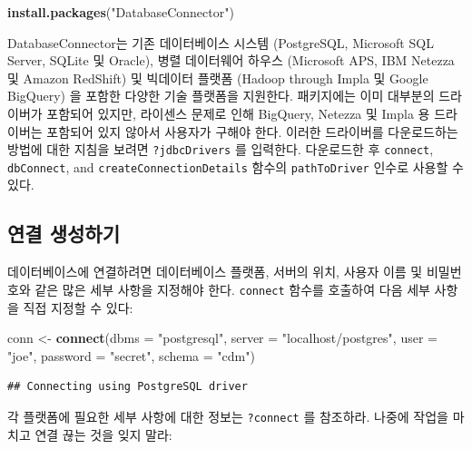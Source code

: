 \documentclass[10.5pt]{book}
\newenvironment{Shaded}{\begin{snugshade}}{\end{snugshade}}
\newcommand{\KeywordTok}[1]{\textcolor[rgb]{0.13,0.29,0.53}{\textbf{#1}}}
\newcommand{\DataTypeTok}[1]{\textcolor[rgb]{0.13,0.29,0.53}{#1}}
\newcommand{\StringTok}[1]{\textcolor[rgb]{0.31,0.60,0.02}{#1}}
\newcommand{\NormalTok}[1]{#1}
\theoremstyle{definition}
\theoremstyle{definition}
\theoremstyle{definition}
\theoremstyle{remark}
\begin{document}
\begin{Shaded}
\begin{Highlighting}[]
\KeywordTok{install.packages}\NormalTok{(}\StringTok{"DatabaseConnector"}\NormalTok{)}
\end{Highlighting}
\end{Shaded}

DatabaseConnector는 기존 데이터베이스 시스템 (PostgreSQL, Microsoft SQL
Server, SQLite 및 Oracle), 병렬 데이터웨어 하우스 (Microsoft APS, IBM
Netezza 및 Amazon RedShift) 및 빅데이터 플랫폼 (Hadoop through Impla 및
Google BigQuery) 을 포함한 다양한 기술 플랫폼을 지원한다. 패키지에는
이미 대부분의 드라이버가 포함되어 있지만, 라이센스 문제로 인해 BigQuery,
Netezza 및 Impla 용 드라이버는 포함되어 있지 않아서 사용자가 구해야
한다. 이러한 드라이버를 다운로드하는 방법에 대한 지침을 보려면
\texttt{?jdbcDrivers} 를 입력한다. 다운로드한 후 \texttt{connect},
\texttt{dbConnect}, and \texttt{createConnectionDetails} 함수의
\texttt{pathToDriver} 인수로 사용할 수 있다.

\subsection{연결 생성하기}\label{-}

데이터베이스에 연결하려면 데이터베이스 플랫폼, 서버의 위치, 사용자 이름
및 비밀번호와 같은 많은 세부 사항을 지정해야 한다. \texttt{connect}
함수를 호출하여 다음 세부 사항을 직접 지정할 수 있다:

\begin{Shaded}
\begin{Highlighting}[]
\NormalTok{conn <-}\StringTok{ }\KeywordTok{connect}\NormalTok{(}\DataTypeTok{dbms =} \StringTok{"postgresql"}\NormalTok{,}
                \DataTypeTok{server =} \StringTok{"localhost/postgres"}\NormalTok{,}
                \DataTypeTok{user =} \StringTok{"joe"}\NormalTok{,}
                \DataTypeTok{password =} \StringTok{"secret"}\NormalTok{,}
                \DataTypeTok{schema =} \StringTok{"cdm"}\NormalTok{)}
\end{Highlighting}
\end{Shaded}

\begin{verbatim}
## Connecting using PostgreSQL driver
\end{verbatim}

각 플랫폼에 필요한 세부 사항에 대한 정보는 \texttt{?connect} 를
참조하라. 나중에 작업을 마치고 연결 끊는 것을 잊지 말라:
\end{document}
